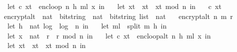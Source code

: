 \begin{isabellebody}
\ \ let\ {\isacharparenleft}{\kern0pt}c{\isacharcomma}{\kern0pt}\ x{\isacharunderscore}{\kern0pt}t{\isacharparenright}{\kern0pt}\ {\isacharequal}{\kern0pt}\ enc{\isacharunderscore}{\kern0pt}loop\ {\isacharparenleft}{\kern0pt}n{\isacharcomma}{\kern0pt}\ h{\isacharcomma}{\kern0pt}\ m{\isacharunderscore}{\kern0pt}l{\isacharparenright}{\kern0pt}\ x{\isacharunderscore}{\kern0pt}{}\ in\ \isanewline
\ \ let\ x{\isacharunderscore}{\kern0pt}t{\isacharprime}{\kern0pt}\ {\isacharequal}{\kern0pt}\ x{\isacharunderscore}{\kern0pt}t\ {\isacharasterisk}{\kern0pt}\ x{\isacharunderscore}{\kern0pt}t\ mod\ n\ in\ \isanewline
\ \ {\isacharparenleft}{\kern0pt}c{\isacharcomma}{\kern0pt}\ x{\isacharunderscore}{\kern0pt}t{\isacharprime}{\kern0pt}{\isacharparenright}{\kern0pt}{\isacharparenright}{\kern0pt}{\isachardoublequoteclose}\isanewline
\isanewline
{}\isamarkupfalse%
\ encrypt{\isacharunderscore}{\kern0pt}alt\ {\isacharcolon}{\kern0pt}{\isacharcolon}{\kern0pt}\ {\isachardoublequoteopen}nat\ {\isasymRightarrow}\ bitstring\ {\isasymRightarrow}\ nat\ {\isasymRightarrow}\ {\isacharparenleft}{\kern0pt}bitstring\ list\ {\isasymtimes}\ nat{\isacharparenright}{\kern0pt}{\isachardoublequoteclose}\ \isanewline
\ \ {\isachardoublequoteopen}encrypt{\isacharunderscore}{\kern0pt}alt\ n\ m\ r\ {\isacharequal}{\kern0pt}\ {\isacharparenleft}{\kern0pt}\isanewline
\ \ let\ h\ {\isacharequal}{\kern0pt}\ nat\ {\isasymlfloor}log\ {}\ {\isacharparenleft}{\kern0pt}log\ {}\ n{\isacharparenright}{\kern0pt}{\isasymrfloor}\ in\ \isanewline
\ \ let\ m{\isacharunderscore}{\kern0pt}l\ {\isacharequal}{\kern0pt}\ split\ m\ h\ in\ \isanewline
\ \ let\ {\isacharparenleft}{\kern0pt}x{\isacharunderscore}{\kern0pt}{}\ {\isacharcolon}{\kern0pt}{\isacharcolon}{\kern0pt}\ nat{\isacharparenright}{\kern0pt}\ {\isacharequal}{\kern0pt}\ {\isacharparenleft}{\kern0pt}r\ {\isacharasterisk}{\kern0pt}\ r{\isacharparenright}{\kern0pt}\ mod\ n\ in\ \isanewline
\ \ let\ {\isacharparenleft}{\kern0pt}c{\isacharcomma}{\kern0pt}\ x{\isacharunderscore}{\kern0pt}t{\isacharparenright}{\kern0pt}\ {\isacharequal}{\kern0pt}\ enc{\isacharunderscore}{\kern0pt}loop{\isacharunderscore}{\kern0pt}alt\ {\isacharparenleft}{\kern0pt}n{\isacharcomma}{\kern0pt}\ h{\isacharcomma}{\kern0pt}\ m{\isacharunderscore}{\kern0pt}l{\isacharparenright}{\kern0pt}\ x{\isacharunderscore}{\kern0pt}{}\ in\ \isanewline
\ \ let\ x{\isacharunderscore}{\kern0pt}t{\isacharprime}{\kern0pt}\ {\isacharequal}{\kern0pt}\ x{\isacharunderscore}{\kern0pt}t\ {\isacharasterisk}{\kern0pt}\ x{\isacharunderscore}{\kern0pt}t\ mod\ n\ in\ \isanewline

\end{isabellebody}
